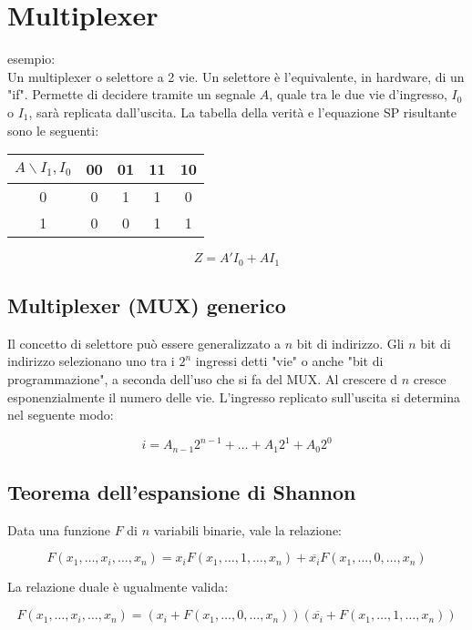 \documentclass{subfiles}
\begin{document}
\section{Multiplexer}

esempio:\\

\noindent
Un multiplexer o selettore a 2 vie.
Un selettore è l'equivalente, in hardware, di un "if".
Permette di decidere tramite un segnale $A$, quale tra le due vie d'ingresso, $I_0$ o $I_1$, sarà replicata dall'uscita.
La tabella della verità e l'equazione SP risultante sono le seguenti:

\begin{center}
\begin{tabular}{ |c|c|c|c|c| }
\hline
$A \backslash I_1,I_0$ & 00 & 01 & 11 & 10 \\
\hline
\hline
0 & 0 & 1 & 1 & 0 \\
1 & 0 & 0 & 1 & 1 \\
\hline
\end{tabular}
\end{center}

$$
Z = A'I_0 + A I_1
$$

\subsection{Multiplexer (MUX) generico}

Il concetto di selettore può essere generalizzato a $n$ bit di indirizzo.
Gli $n$ bit di indirizzo selezionano uno tra i $2^n$ ingressi detti "vie" o anche "bit di programmazione", a seconda dell'uso che si fa del MUX.
Al crescere d $n$ cresce esponenzialmente il numero delle vie.
L'ingresso replicato sull'uscita si determina nel seguente modo:

$$
i = A_{n-1} 2^{n-1} + \dots + A_1 2^1 + A_0 2^0
$$

\subsection{Teorema dell'espansione di Shannon}

Data una funzione $F$ di $n$ variabili binarie, vale la relazione:

$$
F(x_1, \dots, x_i, \dots, x_n) = x_i F(x_1, \dots, 1, \dots, x_n) + \overline{x_i} F(x_1, \dots, 0, \dots, x_n)
$$

\noindent
La relazione duale è ugualmente valida:

$$
F(x_1, \dots, x_i, \dots, x_n) = (x_i + F(x_1, \dots, 0, \dots, x_n))(\overline{x_i} + F(x_1, \dots, 1, \dots, x_n))
$$
\end{document}

